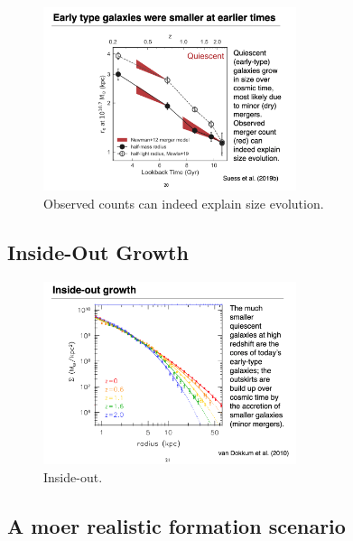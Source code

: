 \documentclass{article}
\begin{document}
\begin{figure}
    \centering
    \includegraphics[width=0.66\textwidth]{figs/Screen Shot 2021-10-20 at 10.51.16 AM.png}
    \caption{Observed counts can indeed explain size evolution.}
    \label{fig:size_evolution_ETGs}
\end{figure}

\subsection{Inside-Out Growth}

\begin{figure}
    \centering
    \includegraphics[width=0.66\textwidth]{figs/Screen Shot 2021-10-20 at 10.52.15 AM.png}
    \caption{Inside-out.}
    \label{fig:vo4}
\end{figure}

\subsection{A moer realistic formation scenario}
\end{document}
